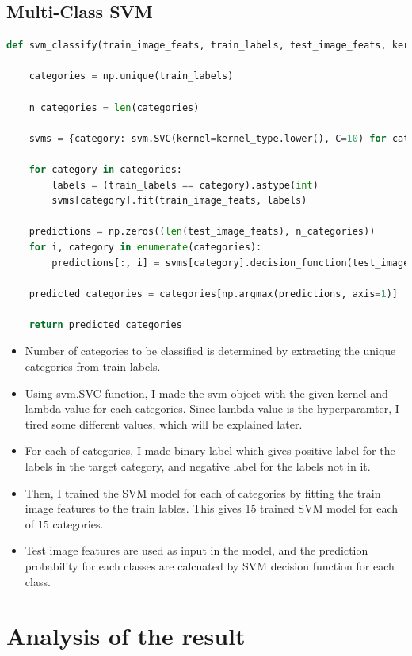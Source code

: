 \subsection*{Multi-Class SVM}
\begin{lstlisting}[language=python]
def svm_classify(train_image_feats, train_labels, test_image_feats, kernel_type):

    categories = np.unique(train_labels)

    n_categories = len(categories)

    svms = {category: svm.SVC(kernel=kernel_type.lower(), C=10) for category in categories}

    for category in categories:
        labels = (train_labels == category).astype(int)
        svms[category].fit(train_image_feats, labels)

    predictions = np.zeros((len(test_image_feats), n_categories))
    for i, category in enumerate(categories):
        predictions[:, i] = svms[category].decision_function(test_image_feats)

    predicted_categories = categories[np.argmax(predictions, axis=1)]

    return predicted_categories    
\end{lstlisting}
\begin{itemize}
    \item Number of categories to be classified is determined by extracting the unique categories from train labels.
    \item Using svm.SVC function, I made the svm object with the given kernel and lambda value for each categories. Since lambda value is the hyperparamter, I tired some different values, which will be explained later.
    \item For each of categories, I made binary label which gives positive label for the labels in the target category, and negative label for the labels not in it.
    \item Then, I trained the SVM model for each of categories by fitting the train image features to the train lables. This gives 15 trained SVM model for each of 15 categories.
    \item Test image features are used as input in the model, and the prediction probability for each classes are calcuated by SVM decision function for each class.
\end{itemize}
\section*{Analysis of the result}
